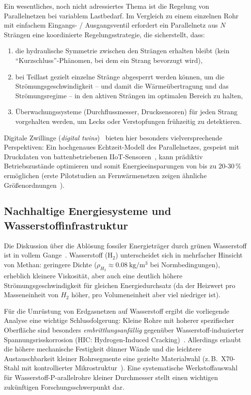 ﻿\documentclass[12pt,a4paper,twoside]{article}
\theoremstyle{plain}
\theoremstyle{definition}
\theoremstyle{remark}
\begin{document}
Ein wesentliches, noch nicht adressiertes Thema ist die Regelung von
Parallelnetzen bei variablem Lastbedarf.
Im Vergleich zu einem einzelnen Rohr mit einfachem Eingangs- / Ausgangsventil
erfordert ein Parallelnetz aus $N$ Strängen eine koordinierte Regelungsstrategie,
die sicherstellt, dass:
\begin{enumerate}
  \item die hydraulische Symmetrie zwischen den Strängen erhalten bleibt
        (kein ``Kurzschluss''-Phänomen, bei dem ein Strang bevorzugt wird),
  \item bei Teillast gezielt einzelne Stränge abgesperrt werden können, um
        die Strömungsgeschwindigkeit -- und damit die Wärmeübertragung und das
        Strömungsregime -- in den aktiven Strängen im optimalen Bereich zu halten,
  \item Überwachungssysteme (Durchflussmesser, Drucksensoren) für jeden Strang
        vorgehalten werden, um Lecks oder Verstopfungen frühzeitig zu detektieren.
\end{enumerate}

Digitale Zwillinge (\textit{digital twins})~\cite{Grieves2016} bieten hier
besonders vielversprechende Perspektiven: Ein hochgenaues Echtzeit-Modell
des Parallelnetzes, gespeist mit Druckdaten von battenbetriebenen
IIoT-Sensoren~\cite{Boyes2018}, kann prädiktiv Betriebszustände optimieren
und somit Energieeinsparungen von bis zu 20-30\,\% ermöglichen
(erste Pilotstudien an Fernwärmenetzen zeigen ähnliche Größenordnungen~\cite{Bianchi2019}).

\subsection{Nachhaltige Energiesysteme und Wasserstoffinfrastruktur}
\label{ssec:ausblick_h2}

Die Diskussion über die Ablösung fossiler Energieträger durch grünen Wasserstoff
ist in vollem Gange~\cite{IEA2019}.
Wasserstoff ($\mathrm{H_2}$) unterscheidet sich in mehrfacher Hinsicht von
Methan: geringere Dichte ($\rho_{H_2} \approx \SI{0.08}{\kilogram\per\metre\cubed}$
bei Normbedingungen), erheblich kleinere Viskosität, aber auch eine deutlich
höhere Strömungsgeschwindigkeit für gleichen Energiedurchsatz (da der Heizwert
pro Masseneinheit von $H_2$ höher, pro Volumeneinheit aber viel niedriger ist).

Für die Umrüstung von Erdgasnetzen auf Wasserstoff ergibt die vorliegende
Analyse eine wichtige Schlussfolgerung:
Kleine Rohre mit hoherer spezifischer Oberfläche sind besonders
\emph{embrittlungsanfällig} gegenüber Wasserstoff-induzierter Spannungsrisskorrosion
(HIC: Hydrogen-Induced Cracking)~\cite{Nanninga2011}.
Allerdings erlaubt die höhere mechanische Festigkeit dünner Wände und die
leichtere Austauschbarkeit kleiner Rohrsegmente eine gezielte Materialwahl
(z.\,B.\ X70-Stahl mit kontrollierter Mikrostruktur~\cite{Dodds2011}).
Eine systematische Werkstoffauswahl für Wasserstoff-P-arallel\-rohre
kleiner Durchmesser stellt einen wichtigen zukünftigen Forschungsschwerpunkt dar.
\end{document}

